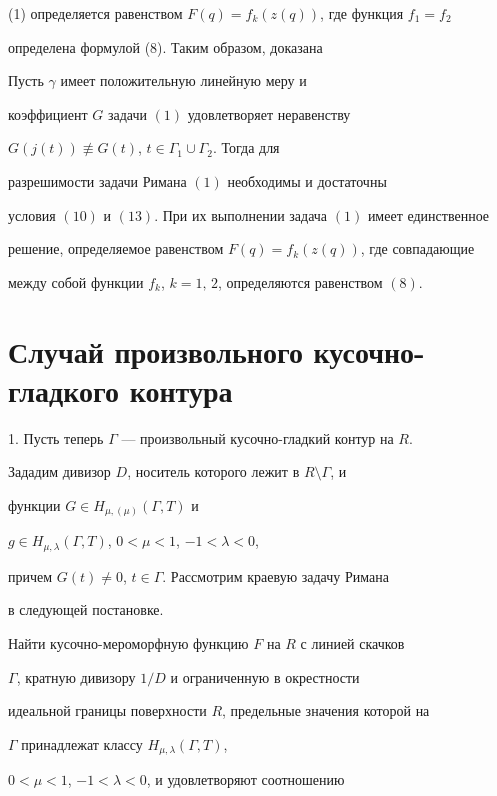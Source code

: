 (1) определяется равенством $F(q)=f_k(z(q))$, где функция $f_1=f_2$


определена формулой (8). Таким образом, доказана





\begin{thm}


Пусть $\gamma$ имеет положительную линейную меру и


коэффициент $G$ задачи $(1)$ удовлетворяет неравенству


$G(j(t))\not\equiv G(t)$, $t\in \Gamma_1\cup\Gamma_2$. Тогда для


разрешимости задачи Римана $(1)$ необходимы и достаточны


условия $(10)$ и $(13)$. При их выполнении задача $(1)$ имеет единственное


решение, определяемое равенством $F(q)=f_k(z(q))$, где совпадающие


между собой функции $f_k$, $k=1,\,2$, определяются равенством $(8)$.


\end{thm}





\section{Случай произвольного кусочно-гладкого контура}





1. Пусть теперь $\Gamma$ --- произвольный кусочно-гладкий контур на $R$.


Зададим дивизор $D$, носитель которого лежит в $R\setminus \Gamma$, и


функции $G \in H_{\mu, (\mu)}(\Gamma, T)$ и


$g \in H_{\mu,\lambda}(\Gamma, T)$, $0<\mu < 1$, $-1<\lambda <0$,


причем $G(t)\ne 0$, $t\in \Gamma$. Рассмотрим краевую задачу Римана


в следующей постановке.





{\it


Найти кусочно-мероморфную функцию $F$ на $R$ с линией скачков


$\Gamma$, кратную дивизору $1/D$ и ограниченную в окрестности


идеальной границы поверхности $R$, предельные значения которой на


$\Gamma$ принадлежат классу $H_{\mu, \lambda}(\Gamma, T)$,


$0<\mu<1$, $-1<\lambda <0$, и удовлетворяют соотношению


}


